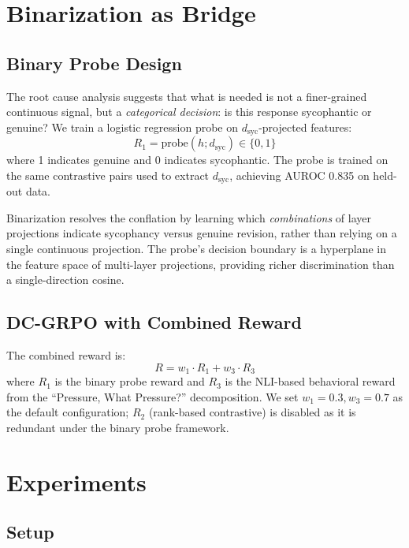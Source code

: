 \documentclass[11pt,a4paper]{article}
\newcommand{\dsyc}{d_{\text{syc}}}
\begin{document}
\section{Binarization as Bridge}
\label{sec:probe}

\subsection{Binary Probe Design}

The root cause analysis suggests that what is needed is not a finer-grained continuous signal, but a \emph{categorical decision}: is this response sycophantic or genuine? We train a logistic regression probe on $\dsyc$-projected features:
\begin{equation}
    R_1 = \text{probe}(h; \dsyc) \in \{0, 1\}
\end{equation}
where 1 indicates genuine and 0 indicates sycophantic. The probe is trained on the same contrastive pairs used to extract $\dsyc$, achieving AUROC 0.835 on held-out data.

Binarization resolves the conflation by learning which \emph{combinations} of layer projections indicate sycophancy versus genuine revision, rather than relying on a single continuous projection. The probe's decision boundary is a hyperplane in the feature space of multi-layer projections, providing richer discrimination than a single-direction cosine.

\subsection{DC-GRPO with Combined Reward}

The combined reward is:
\begin{equation}
    R = w_1 \cdot R_1 + w_3 \cdot R_3
\end{equation}
where $R_1$ is the binary probe reward and $R_3$ is the NLI-based behavioral reward from the ``Pressure, What Pressure?'' decomposition. We set $w_1 = 0.3, w_3 = 0.7$ as the default configuration; $R_2$ (rank-based contrastive) is disabled as it is redundant under the binary probe framework.


\section{Experiments}
\label{sec:experiments}

\subsection{Setup}
\end{document}
